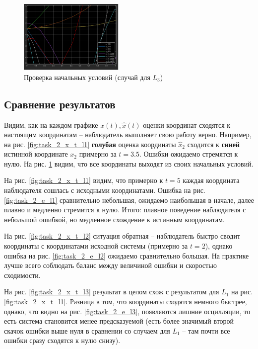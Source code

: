 \documentclass[a4paper, 12pt]{article}
\begin{document}
    \begin{figure}[H]
        \centering
        \includegraphics[width=0.45\textwidth]{x_0_x_est_0_l3_task2.png}
        \captionsetup{skip=0pt}
        \caption{Проверка начальных условий (случай для $L_3$)}
        \label{fig:x_0_check}
    \end{figure}


    \subsection{Сравнение результатов}
    Видим, как на каждом графике $x(t),\hat{x}(t)$ оценки координат сходятся к настоящим координатам -- наблюдатель
    выполняет свою работу верно. Например, на рис. \ref{fig:task_2_x_t_l1} \textbf{голубая} оценка координаты $\hat{x}_2$ сходится
    к \textbf{синей} истинной координате $x_2$ примерно за $t=3.5$. Ошибки ожидаемо стремятся к нулю. На рис. \ref{fig:x_0_check}
    видим, что все координаты выходят из своих начальных условий.


    На рис. \ref{fig:task_2_x_t_l1} видим, что примерно к $t=5$ каждая координата наблюдателя сошлась с исходными координатами.
    Ошибка на рис. \ref{fig:task_2_e_l1} сравнительно небольшая, ожидаемо наибольшая в начале, далее плавно и медленно стремится к нулю.
    Итого: плавное поведение наблюдателя с небольшой ошибкой, но медленное схождение к истинным координатам.


    На рис. \ref{fig:task_2_x_t_l2} ситуация обратная -- наблюдатель быстро сводит координаты с координатами
    исходной системы (примерно за $t=2$), однако ошибка на рис. \ref{fig:task_2_e_l2} ожидаемо сравнительно большая. На практике лучше всего
    соблюдать баланс между величиной ошибки и скоростью сходимости.


    На рис. \ref{fig:task_2_x_t_l3} результат в целом схож с результатом для $L_1$ на рис. \ref{fig:task_2_x_t_l1}.
    Разница в том, что координаты сходятся немного быстрее, однако, что видно на рис. \ref{fig:task_2_e_l3}, появляются
    лишние осцилляции, то есть система становится менее предсказуемой (есть более значимый второй скачок ошибки выше нуля
    в сравнении со случаем для $L_1$ -- там почти все ошибки сразу сходятся к нулю снизу).
\end{document}
